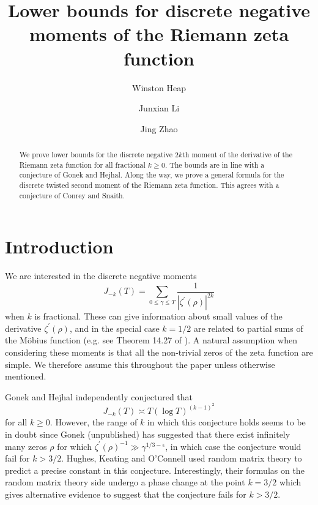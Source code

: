 \documentclass[oneside, 12pt]{amsart}
\theoremstyle{definition}
\newcommand{\leqs}{\leqslant }
\newcommand{\geqs}{\geqslant }
\begin{document}
\title[Discrete negative moments]{Lower bounds for discrete negative moments of the Riemann zeta function}

\author{Winston Heap}
\address{Max Planck Institute for Mathematics, Vivatsgasse 7, 53111 Bonn.}

\author{Junxian Li}
\address{Max Planck Institute for Mathematics, Vivatsgasse 7, 53111 Bonn.}

\author{Jing Zhao}
\address{Max Planck Institute for Mathematics, Vivatsgasse 7, 53111 Bonn.}

\maketitle


\begin{abstract}
We prove lower bounds for the discrete negative $2k$th moment of the derivative of the Riemann zeta function for all fractional $k\geqslant 0$. The bounds are in line with a conjecture of Gonek and Hejhal. Along the way, we  prove a general formula for the discrete twisted second moment of the Riemann zeta function. This agrees with a conjecture of Conrey and Snaith.
\end{abstract}









\section{Introduction}



We are interested in the discrete negative moments 
\begin{equation}
J_{-k}(T)=\sum_{0\leqs \gamma\leqs T} \frac{1}{|\zeta^\prime(\rho)|^{2k}}
\end{equation}
when $k$ is fractional. These can give information about small values of the derivative $\zeta^\prime(\rho)$, and in the special case $k=1/2$ are related to partial sums of the M\"obius function (e.g. see Theorem 14.27 of \cite{T}). A natural assumption when considering these moments is that all the non-trivial zeros of the zeta function are simple. We therefore assume this throughout the paper unless otherwise mentioned. 

Gonek \cite{G} and Hejhal \cite{H} independently conjectured that 
\[
J_{-k}(T)\asymp T(\log T)^{(k-1)^2}
\]
for all $k\geqs 0$. However, the range of $k$ in which this conjecture holds seems to be in doubt since Gonek (unpublished) has suggested that there exist infinitely many zeros $\rho$ for which $\zeta^\prime(\rho)^{-1}\gg \gamma^{1/3-\epsilon}$, in which case the conjecture would fail for $k>3/2$. Hughes, Keating and O'Connell \cite{HKO} used random matrix theory to predict a precise constant in this conjecture. Interestingly, their formulas on the random matrix theory side undergo a phase change at the point $k=3/2$ which gives alternative evidence to suggest that the conjecture fails for $k>3/2$. 
\end{document}
